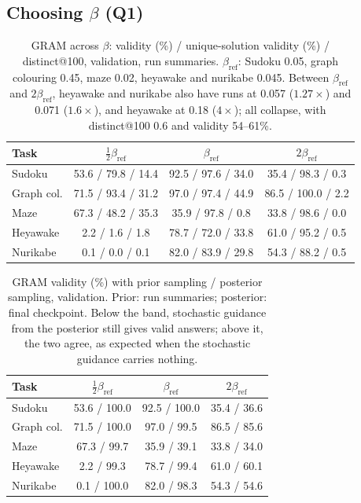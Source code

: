 \documentclass{article}
\begin{document}
\subsection{Choosing $\beta$ (Q1)}
\label{sec:band}

\begin{table}[t]
\centering\footnotesize
\setlength{\tabcolsep}{1.5pt}
\begin{tabular}{@{}lccc@{}}
\toprule
Task & $\frac12\beta_{\mathrm{ref}}$ & $\beta_{\mathrm{ref}}$ & $2\beta_{\mathrm{ref}}$ \\
\midrule
Sudoku & 53.6 / 79.8 / 14.4 & 92.5 / 97.6 / 34.0 & 35.4 / 98.3 / 0.3 \\
Graph col. & 71.5 / 93.4 / 31.2 & 97.0 / 97.4 / 44.9 & 86.5 / 100.0 / 2.2 \\
Maze & 67.3 / 48.2 / 35.3 & 35.9 / 97.8 / 0.8 & 33.8 / 98.6 / 0.0 \\
Heyawake & 2.2 / 1.6 / 1.8 & 78.7 / 72.0 / 33.8 & 61.0 / 95.2 / 0.5 \\
Nurikabe & 0.1 / 0.0 / 0.1 & 82.0 / 83.9 / 29.8 & 54.3 / 88.2 / 0.5 \\
\bottomrule
\end{tabular}
\caption{GRAM across $\beta$: validity (\%) / unique-solution validity (\%) / distinct@100, validation, run
summaries. $\beta_{\mathrm{ref}}$: Sudoku 0.05, graph colouring 0.45, maze 0.02, heyawake and nurikabe 0.045.
Between $\beta_{\mathrm{ref}}$ and $2\beta_{\mathrm{ref}}$, heyawake and nurikabe also have runs at 0.057
($1.27\times$) and 0.071 ($1.6\times$), and heyawake at 0.18 ($4\times$); all collapse, with distinct@100 0.6 and
validity 54--61\%.}
\label{tab:beta}
\end{table}

\begin{table}[t]
\centering\footnotesize
\setlength{\tabcolsep}{4pt}
\begin{tabular}{@{}lccc@{}}
\toprule
Task & $\frac12\beta_{\mathrm{ref}}$ & $\beta_{\mathrm{ref}}$ & $2\beta_{\mathrm{ref}}$ \\
\midrule
Sudoku & 53.6 / 100.0 & 92.5 / 100.0 & 35.4 / 36.6 \\
Graph col. & 71.5 / 100.0 & 97.0 / 99.5 & 86.5 / 85.6 \\
Maze & 67.3 / 99.7 & 35.9 / 39.1 & 33.8 / 34.0 \\
Heyawake & 2.2 / 99.3 & 78.7 / 99.4 & 61.0 / 60.1 \\
Nurikabe & 0.1 / 100.0 & 82.0 / 98.3 & 54.3 / 54.6 \\
\bottomrule
\end{tabular}
\caption{GRAM validity (\%) with prior sampling / posterior sampling, validation. Prior: run summaries; posterior:
final checkpoint. Below the band, stochastic guidance from the posterior still gives valid answers; above it, the two
agree, as expected when the stochastic guidance carries nothing.}
\label{tab:posterior}
\end{table}
\end{document}
